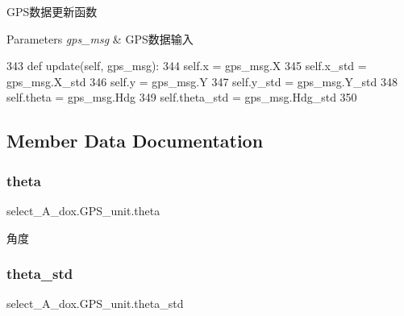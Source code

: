 G\+P\+S数据更新函数 


\begin{DoxyParams}{Parameters}
{\em gps\+\_\+msg} & G\+P\+S数据输入 \\
\hline
\end{DoxyParams}

\begin{DoxyCode}
343     \textcolor{keyword}{def }update(self, gps\_msg):
344         self.x = gps\_msg.X
345         self.x\_std = gps\_msg.X\_std
346         self.y = gps\_msg.Y
347         self.y\_std = gps\_msg.Y\_std
348         self.theta = gps\_msg.Hdg
349         self.theta\_std = gps\_msg.Hdg\_std
350 
\end{DoxyCode}


\subsection{Member Data Documentation}
\mbox{\label{classselect___a__dox_1_1_g_p_s__unit_a4b964c306cd5e95f2dccb8000a39304e}} 
\subsubsection{\texorpdfstring{theta}{theta}}
{\footnotesize\ttfamily select\+\_\+\+A\+\_\+dox.\+G\+P\+S\+\_\+unit.\+theta}



角度 

\mbox{\label{classselect___a__dox_1_1_g_p_s__unit_ad7bfc54e5c4577fbc4b3d9bad886e91e}} 
\subsubsection{\texorpdfstring{theta\+\_\+std}{theta\_std}}
{\footnotesize\ttfamily select\+\_\+\+A\+\_\+dox.\+G\+P\+S\+\_\+unit.\+theta\+\_\+std}



